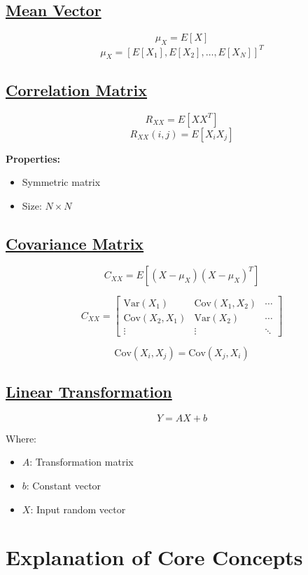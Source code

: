 \documentclass[11pt]{article}
\begin{document}
\vspace{0.5cm}
\subsection*{\underline{Mean Vector}}
\[
\mu_X = E[X]
\]
\[
\mu_X = [E[X_1], E[X_2], \dots, E[X_N]]^T
\]

\vspace{0.5cm}
\subsection*{\underline{Correlation Matrix}}
\[
R_{XX} = E[XX^T]
\]
\[
R_{XX}(i,j) = E[X_i X_j]
\]

\textbf{Properties:}
\begin{itemize}
    \item Symmetric matrix
    \item Size: $N \times N$
\end{itemize}

\vspace{0.5cm}
\subsection*{\underline{Covariance Matrix}}
\[
C_{XX} = E[(X - \mu_X)(X - \mu_X)^T]
\]

\[
C_{XX} =
\begin{bmatrix}
\mathrm{Var}(X_1) & \mathrm{Cov}(X_1,X_2) & \cdots \\
\mathrm{Cov}(X_2,X_1) & \mathrm{Var}(X_2) & \cdots \\
\vdots & \vdots & \ddots
\end{bmatrix}
\]

\[
\mathrm{Cov}(X_i, X_j) = \mathrm{Cov}(X_j, X_i)
\]

\vspace{0.5cm}
\subsection*{\underline{Linear Transformation}}
\[
Y = AX + b
\]

Where:
\begin{itemize}
    \item $A$: Transformation matrix
    \item $b$: Constant vector
    \item $X$: Input random vector
\end{itemize}

\vspace{1cm}
\section{Explanation of Core Concepts}
\end{document}

